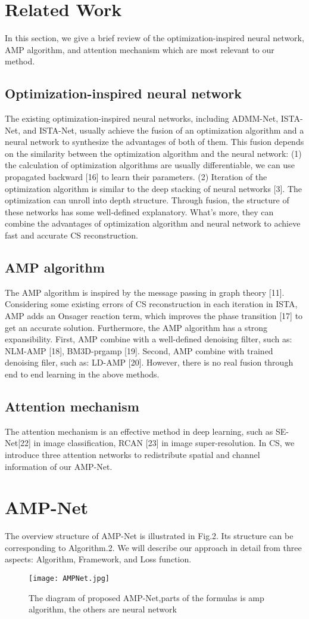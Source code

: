\documentclass[conference]{IEEEtran}
\begin{document}
\section{Related Work}
In this section, we give a brief review of the optimization-inspired neural network, AMP algorithm, and attention mechanism which are most relevant to our method.
\subsection{Optimization-inspired neural network}
The existing optimization-inspired neural networks, including ADMM-Net, ISTA-Net, and ISTA-Net, usually achieve the fusion of an optimization algorithm and a neural network to synthesize the advantages of both of them. This fusion depends on the similarity between the optimization algorithm and the neural network: (1) the calculation of optimization algorithms are usually differentiable, we can use propagated backward [16] to learn their parameters. (2) Iteration of the optimization algorithm is similar to the deep stacking of neural networks [3]. The optimization can unroll into depth structure.
Through fusion, the structure of these networks has some well-defined explanatory. What's more, they can combine the advantages of optimization algorithm and neural network to achieve fast and accurate CS reconstruction.
\subsection{AMP algorithm}
The AMP algorithm is inspired by the message passing in graph theory [11]. Considering some existing errors of CS reconstruction in each iteration in ISTA, AMP adds an Onsager reaction term, which improves the phase transition [17] to get an accurate solution. Furthermore, the AMP algorithm has a strong expansibility. First, AMP combine with a well-defined denoising filter, such as: NLM-AMP [18], BM3D-prgamp [19]. Second, AMP combine with trained denoising filer, such as: LD-AMP [20]. However, there is no real fusion through end to end learning in the above methods.
\subsection{Attention mechanism}
The attention mechanism is an effective method in deep learning, such as SE-Net[22] in image classification, RCAN [23]  in image super-resolution. In CS, we introduce three attention networks to redistribute spatial and channel information of our AMP-Net.
\section{AMP-Net}
The overview structure of AMP-Net is illustrated in Fig.2. Its structure can be corresponding to Algorithm.2.  We will describe our approach in detail from three aspects: Algorithm, Framework, and  Loss function.
\begin{figure*}[t]
\centering
\texttt{[image: AMPNet.jpg]} \caption{The diagram of proposed AMP-Net,parts of the formulas is amp algorithm, the others are neural network}
\label{fig:AMPNet} \end{figure*}
\end{document}

